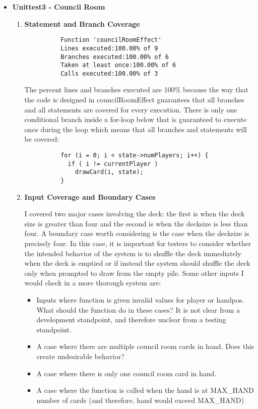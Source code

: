 \documentclass[11pt,letterpaper]{article}
\begin{document}
\begin{enumerate}[label=\Roman*.]
\begin{itemize}[leftmargin=*]
      \item \textbf{Unittest3 - Council Room}
      
        \begin{enumerate}[leftmargin=*]
          \item \textbf{Statement and Branch Coverage}

          \begin{lstlisting}
          Function 'councilRoomEffect'
          Lines executed:100.00% of 9
          Branches executed:100.00% of 6
          Taken at least once:100.00% of 6
          Calls executed:100.00% of 3
          \end{lstlisting}
          
            The percent lines and branches executed are 100\% because the way that the
            code is designed in councilRoomEffect guarantees that all branches
            and all statements are covered for every execution. There is only
            one conditional branch inside a for-loop below that is guaranteed
            to execute once during the loop which means that all branches
            and statements will be covered:

          \begin{lstlisting}
          for (i = 0; i < state->numPlayers; i++) {
            if ( i != currentPlayer )
              drawCard(i, state);
          }
          \end{lstlisting}


        \item \textbf{Input Coverage and Boundary Cases}

          I covered two major cases involving the deck: the first is when the deck size is greater than
            four and the second is when the decksize is less than four. A boundary case worth considering
            is the case when the decksize is precisely four. In this case, it is important for testers
            to consider whether the intended behavior of the system is to shuffle the deck immediately
            when the deck is emptied or if instead the system should shuffle the deck only when prompted
            to draw from the empty pile. Some other inputs I would check in a more thorough system are:
          \begin{itemize}
            \item Inputs where function is given invalid values for player or handpos. What
                should the function do in these cases? It is not clear from a development
                standpoint, and therefore unclear from a testing standpoint. 
            \item A case where there are multiple council room cards in hand. Does this create
              undesirable behavior?
            \item A case where there is only one council room card in hand.
            \item A case where the function is called when the hand is at MAX\_HAND number of cards (and therefore, hand would exceed MAX\_HAND)
          \end{itemize}
        \end{enumerate}


\end{itemize}
\end{enumerate}
\end{document}
